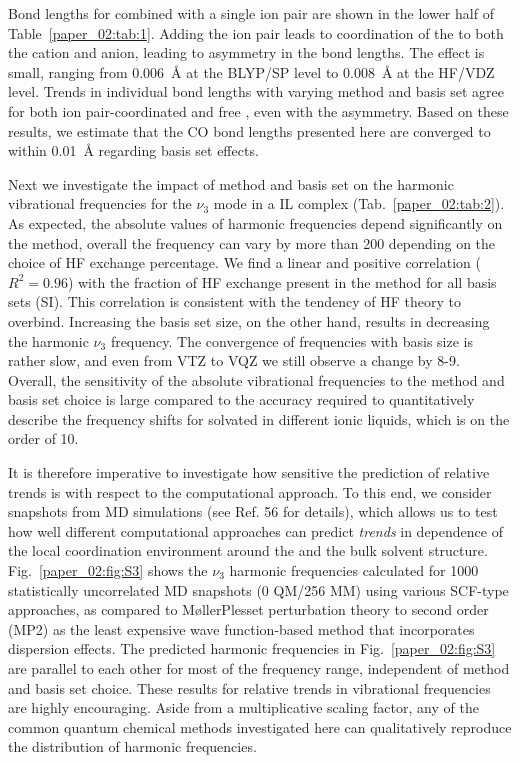 Bond lengths for  combined with a single ion pair are shown in the lower half of Table~\ref{paper_02:tab:1}. Adding the ion pair leads to coordination of the  to both the cation and anion, leading to asymmetry in the  bond lengths. The effect is small, ranging from \SI{0.006}{\angstrom} at the BLYP/SP level to \SI{0.008}{\angstrom} at the HF/VDZ level. Trends in individual  bond lengths with varying method and basis set agree for both ion pair-coordinated  and free , even with the asymmetry. Based on these results, we estimate that the CO bond lengths presented here are converged to within \SI{0.01}{\angstrom} regarding basis set effects.

Next we investigate the impact of method and basis set on the harmonic vibrational frequencies for the \(\nu_{3}\) mode in a \textendash{}IL complex (Tab.~\ref{paper_02:tab:2}). As expected, the absolute values of harmonic frequencies depend significantly on the method, overall the frequency can vary by more than \SI{200}{\wavenumber} depending on the choice of HF exchange percentage. We find a linear and positive correlation (\(R^{2} = 0.96\)) with the fraction of HF exchange present in the method for all basis sets (SI). This correlation is consistent with the tendency of HF theory to overbind. Increasing the basis set size, on the other hand, results in decreasing the harmonic  \(\nu_{3}\) frequency. The convergence of frequencies with basis size is rather slow, and even from VTZ to VQZ we still observe a change by \num{8}-\SI{9}{\wavenumber}. Overall, the sensitivity of the absolute vibrational frequencies to the method and basis set choice is large compared to the accuracy required to quantitatively describe the frequency shifts for  solvated in different ionic liquids, which is on the order of \SI{10}{\wavenumber}.

It is therefore imperative to investigate how sensitive the prediction of relative trends is with respect to the computational approach. To this end, we consider snapshots from MD simulations (see Ref. 56 for details), which allows us to test how well different computational approaches can predict \emph{trends} in dependence of the local coordination environment around the  and the bulk solvent structure. Fig.~\ref{paper_02:fig:S3} shows the  \(\nu_{3}\) harmonic frequencies calculated for \num{1000} statistically uncorrelated MD snapshots (0 QM/256 MM) using various SCF-type approaches, as compared to M\o{}ller\textendash{}Plesset perturbation theory to second order (MP2) as the least expensive wave function-based method that incorporates dispersion effects.\cite{47} The predicted harmonic frequencies in Fig.~\ref{paper_02:fig:S3} are parallel to each other for most of the frequency range, independent of method and basis set choice. These results for relative trends in vibrational frequencies are highly encouraging. Aside from a multiplicative scaling factor, any of the common quantum chemical methods investigated here can qualitatively reproduce the distribution of harmonic frequencies.


